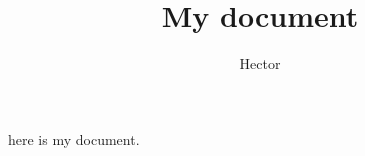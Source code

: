 \documentclass{article}
\title{My document}
\author{Hector}
\begin{document}
\maketitle
here is my document.
\end{document}
